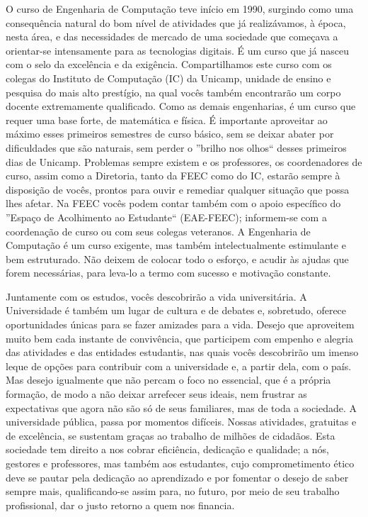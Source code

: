 O curso de Engenharia de Computação teve início em 1990, surgindo como uma
consequência natural do bom nível de atividades que já realizávamos, à época,
nesta área, e das necessidades de mercado de uma sociedade que começava a
orientar-se intensamente para as tecnologias digitais. É um curso que já nasceu
com o selo da excelência e da exigência. Compartilhamos este curso com os
colegas do Instituto de Computação (IC) da Unicamp, unidade de ensino e
pesquisa do mais alto prestígio, na qual vocês também encontrarão um corpo
docente extremamente qualificado. Como as demais engenharias, é um curso que
requer uma base forte, de matemática e física. É importante aproveitar ao
máximo esses primeiros semestres de curso básico, sem se deixar abater por
dificuldades que são naturais, sem perder o ''brilho nos olhos`` desses
primeiros dias de Unicamp. Problemas sempre existem e os professores, os
coordenadores de curso, assim como a Diretoria, tanto da FEEC como do IC,
estarão sempre à disposição de vocês, prontos para ouvir e remediar qualquer
situação que possa lhes afetar. Na FEEC vocês podem contar também com o apoio
específico do ''Espaço de Acolhimento ao Estudante`` (EAE-FEEC); informem-se
com a coordenação de curso ou com seus colegas veteranos. A Engenharia de
Computação é um curso exigente, mas também intelectualmente estimulante e bem
estruturado. Não deixem de colocar todo o esforço, e acudir às ajudas que forem
necessárias, para leva-lo a termo com sucesso e motivação constante.

Juntamente com os estudos, vocês descobrirão a vida universitária. A
Universidade é também um lugar de cultura e de debates e, sobretudo, oferece
oportunidades únicas para se fazer amizades para a vida. Desejo que aproveitem
muito bem cada instante de convivência, que participem com empenho e alegria
das atividades e das entidades estudantis, nas quais vocês descobrirão um
imenso leque de opções para contribuir com a universidade e, a partir dela, com
o país. Mas desejo igualmente que não percam o foco no essencial, que é a
própria formação, de modo a não deixar arrefecer seus ideais, nem frustrar as
expectativas que agora não são só de seus familiares, mas de toda a sociedade.
A universidade pública, passa por momentos difíceis. Nossas atividades,
gratuitas e de excelência, se sustentam graças ao trabalho de milhões de
cidadãos. Esta sociedade tem direito a nos cobrar eficiência, dedicação e
qualidade; a nós, gestores e professores, mas também aos estudantes, cujo
comprometimento ético deve se pautar pela dedicação ao aprendizado e por
fomentar o desejo de saber sempre mais, qualificando-se assim para, no futuro,
por meio de seu trabalho profissional, dar o justo retorno a quem nos financia.

